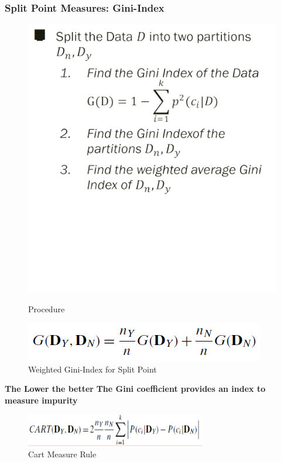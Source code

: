 \begin{itemize}
    \subsubsection{Split Point Measures: Gini-Index}    
\begin{figure}[H]
    \centering
    \begin{minipage}{0.5\textwidth}
        \centering
        \includegraphics[width=\textwidth]{Figures/dt5.png} %
        \caption{Procedure}
    \end{minipage}\hfill
    \begin{minipage}{0.5\textwidth}
        \centering
        \includegraphics[width=\textwidth]{Figures/dt6.png} %
        \caption{Weighted Gini-Index for Split Point}
    \end{minipage}
\end{figure}
\textbf{The Lower the better}
\textbf{The Gini coefficient provides an index to measure impurity}
\begin{figure}[H]
\centerline{\includegraphics[width=0.7\textwidth]{Figures/cart}}
\caption{\label{fig:figure}Cart Measure Rule}
\end{figure}


\end{itemize}
